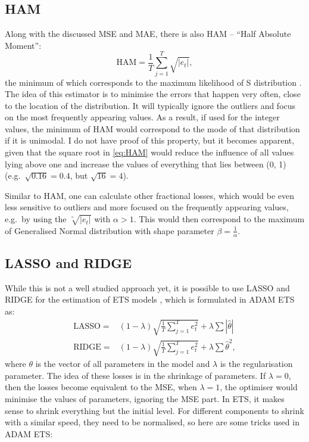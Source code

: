 \documentclass[
]{book}
\theoremstyle{definition}
\theoremstyle{definition}
\theoremstyle{definition}
\theoremstyle{definition}
\theoremstyle{remark}
\begin{document}
\hypertarget{ham}{%
\subsection{HAM}\label{ham}}

Along with the discussed MSE and MAE, there is also HAM -- ``Half Absolute Moment'':
\begin{equation}
  \mathrm{HAM} = \frac{1}{T} \sum_{j=1}^T \sqrt{\left|e_t\right|},
  \label{eq:HAM}
\end{equation}
the minimum of which corresponds to the maximum likelihood of S distribution \citep[see Chapter 3 of][]{SvetunkovSBA}. The idea of this estimator is to minimise the errors that happen very often, close to the location of the distribution. It will typically ignore the outliers and focus on the most frequently appearing values. As a result, if used for the integer values, the minimum of HAM would correspond to the mode of that distribution if it is unimodal. I do not have proof of this property, but it becomes apparent, given that the square root in \eqref{eq:HAM} would reduce the influence of all values lying above one and increase the values of everything that lies between (0, 1) (e.g.~\(\sqrt{0.16}=0.4\), but \(\sqrt{16}=4\)).

Similar to HAM, one can calculate other fractional losses, which would be even less sensitive to outliers and more focused on the frequently appearing values, e.g.~by using the \(\sqrt[^\alpha]{\left|e_t\right|}\) with \(\alpha>1\). This would then correspond to the maximum of Generalised Normal distribution with shape parameter \(\beta=\frac{1}{\alpha}\).

\hypertarget{lasso-and-ridge}{%
\subsection{LASSO and RIDGE}\label{lasso-and-ridge}}

While this is not a well studied approach yet, it is possible to use LASSO \citep{Tibshirani1996} and RIDGE for the estimation of ETS models \citep[ give a good overview of these losses with examples in R]{James2017}, which is formulated in ADAM ETS as:
\begin{equation}
  \begin{aligned}
    \mathrm{LASSO} = &(1-\lambda) \sqrt{\frac{1}{T} \sum_{j=1}^T e_t^2} + \lambda \sum |\hat{\theta}| \\
    \mathrm{RIDGE} = &(1-\lambda) \sqrt{\frac{1}{T} \sum_{j=1}^T e_t^2} + \lambda \sum \hat{\theta}^2,
  \end{aligned}
  \label{eq:Regularisation}
\end{equation}
where \(\theta\) is the vector of all parameters in the model and \(\lambda\) is the regularisation parameter. The idea of these losses is in the shrinkage of parameters. If \(\lambda=0\), then the losses become equivalent to the MSE, when \(\lambda=1\), the optimiser would minimise the values of parameters, ignoring the MSE part. In ETS, it makes sense to shrink everything but the initial level. For different components to shrink with a similar speed, they need to be normalised, so here are some tricks used in ADAM ETS:
\end{document}
